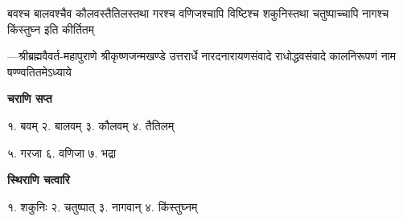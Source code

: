 \label{app:karanam_names}

\addtocounter{shlokacount}{81}
\threelineshloka
{बवश्च बालवश्चैव कौलवस्तैतिलस्तथा}
{गरश्च वणिजश्चापि विष्टिश्च शकुनिस्तथा}
{चतुष्पाच्चापि नागश्च किंस्तुघ्न इति कीर्तितम्}

{\fontsize{10}{4}\selectfont —श्रीब्रह्मवैवर्त-महापुराणे श्रीकृष्णजन्मखण्डे उत्तरार्धे नारदनारायणसंवादे राधोद्धवसंवादे कालनिरूपणं नाम षण्ण्वतितमेऽध्याये}

\begin{center}
{\bfseries {चराणि सप्त}}

१. बवम् \hspace{2ex} २. बालवम् \hspace{2ex} ३. कौलवम् \hspace{2ex} ४. तैतिलम्

५. गरजा \hspace{2ex} ६. वणिजा  \hspace{2ex}७. भद्रा

{\bfseries {स्थिराणि चत्वारि}}

१. शकुनिः \hspace{2ex} २. चतुष्पात् \hspace{2ex} ३. नागवान् \hspace{2ex} ४. किंस्तुघ्नम्

\end{center}


